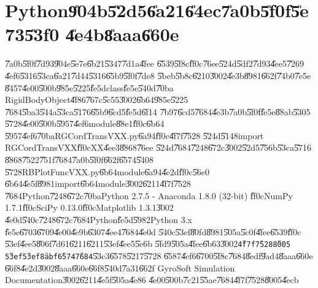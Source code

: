 \documentclass[12pt,a4paper]{article}
\begin{document}
%

\part{Python\U{904b}\U{52d5}\U{6a21}\U{64ec}\U{7a0b}\U{5f0f}\U{5e73}\U{53f0}%
\U{4e4b}\U{8aaa}\U{660e}}

\setcounter{page}{1}\bigskip

\bigskip

\U{7a0b}\U{5f0f}\U{7d93}\U{904e}\U{5e7e}\U{6b21}\U{5347}\U{7d1a}\U{4fee}%
\U{6539}\U{5f8c}\U{ff0c}\U{76ee}\U{524d}\U{5df2}\U{7d93}\U{4ee5}\U{7269}%
\U{4ef6}\U{5316}\U{53ca}\U{6a21}\U{7d44}\U{5316}\U{65b9}\U{5f0f}\U{7de8}%
\U{5beb}\U{5b8c}\U{6210}\U{3002}\U{4e3b}\U{8981}\U{662f}\U{74b0}\U{7e5e}%
\U{8457}\U{4e00}\U{500b}\U{985e}\U{5225}\U{fe5d}class\U{fe5e}\U{540d}\U{70ba}%
RigidBodyObject\U{4f86}\U{767c}\U{5c55}\U{3002}\U{6b64}\U{985e}\U{5225}%
\U{7684}\U{5ba3}\U{544a}\U{53ca}\U{5176}\U{65b9}\U{6cd5}\U{fe5d}\U{6f14}%
\U{7b97}\U{6cd5}\U{7684}\U{4e3b}\U{7a0b}\U{5f0f}\U{fe5e}\U{88ab}\U{5305}%
\U{5728}\U{4e00}\U{500b}\U{5957}\U{4ef6}module\U{88e1}\U{ff0c}\U{6b64}%
\U{5957}\U{4ef6}\U{70ba}RGCordTransVXX.py\U{6a94}\U{ff0c}\U{4f7f}\U{7528}%
\U{524d}\U{5148}import RGCordTransVXX\U{ff0c}XX\U{4ee3}\U{8868}\U{76ee}%
\U{524d}\U{7684}\U{7248}\U{672c}\U{3002}\U{52d5}\U{756b}\U{53ca}\U{5716}%
\U{8868}\U{7522}\U{751f}\U{7684}\U{7a0b}\U{5f0f}\U{662f}\U{6574}\U{5408}%
\U{5728}RBPlotFuncVXX.py\U{6b64}module\U{6a94}\U{4e2d}\U{ff0c}\U{56e0}%
\U{6b64}\U{4e5f}\U{8981}import\U{6b64}module\U{3002}\U{6211}\U{4f7f}\U{7528}%
\U{7684}Python\U{7248}\U{672c}\U{70ba}Python 2.7.5 - Anaconda 1.8.0 (32-bit)%
\U{ff0c}NumPy 1.7.1\U{ff0c}SciPy 0.13.0\U{ff0c}Matplotlib 1.3.1\U{3002}%
\U{4e0d}\U{540c}\U{7248}\U{672c}\U{7684}Python\U{fe5d}\U{5982}Python 3.x%
\U{fe5e}\U{6703}\U{6709}\U{4e00}\U{4e9b}\U{6307}\U{4ee4}\U{7684}\U{4e0d}%
\U{540c}\U{53ef}\U{80fd}\U{8981}\U{505a}\U{5c0f}\U{4fee}\U{6539}\U{ff0c}%
\U{53ef}\U{4ee5}\U{806f}\U{7d61}\U{6211}\U{6211}\U{53ef}\U{4ee5}\U{5e6b}%
\U{5fd9}\U{505a}\U{4fee}\U{6b63}\U{3002}\texttt{\U{4f7f}\U{7528}\U{8005}%
\U{53ef}\U{53ef}\U{8abf}\U{6574}\U{7684}}\U{53c3}\U{6578}\U{5217}\U{5728}%
\U{6587}\U{4ef6}\U{6700}\U{5f8c}\U{7684}\U{8edf}\U{9ad4}\U{8aaa}\U{660e}%
\U{66f8}\U{4e2d}\U{3002}\U{8aaa}\U{660e}\U{66f8}\U{540d}\U{7a31}\U{662f}%
GyroSoft Simulation Documentation\U{3002}\U{6211}\U{4e5f}\U{505a}\U{4e86}%
\U{4e00}\U{500b}\U{7c21}\U{55ae}\U{7684}\U{4f7f}\U{7528}\U{8005}\U{4ecb}%
\end{document}
